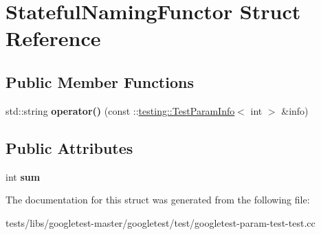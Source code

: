 \hypertarget{structStatefulNamingFunctor}{}\section{Stateful\+Naming\+Functor Struct Reference}
\label{structStatefulNamingFunctor}
\subsection*{Public Member Functions}
\begin{DoxyCompactItemize}
\item 
\mbox{\label{structStatefulNamingFunctor_a6a1d07c0b8314c1aee535f269ea536db}} 
std\+::string {\bfseries operator()} (const \+::\hyperlink{structtesting_1_1TestParamInfo}{testing\+::\+Test\+Param\+Info}$<$ int $>$ \&info)
\end{DoxyCompactItemize}
\subsection*{Public Attributes}
\begin{DoxyCompactItemize}
\item 
\mbox{\label{structStatefulNamingFunctor_a95887cf031d3113ae2edcd7617af3b79}} 
int {\bfseries sum}
\end{DoxyCompactItemize}


The documentation for this struct was generated from the following file\+:\begin{DoxyCompactItemize}
\item 
tests/libs/googletest-\/master/googletest/test/googletest-\/param-\/test-\/test.\+cc\end{DoxyCompactItemize}

